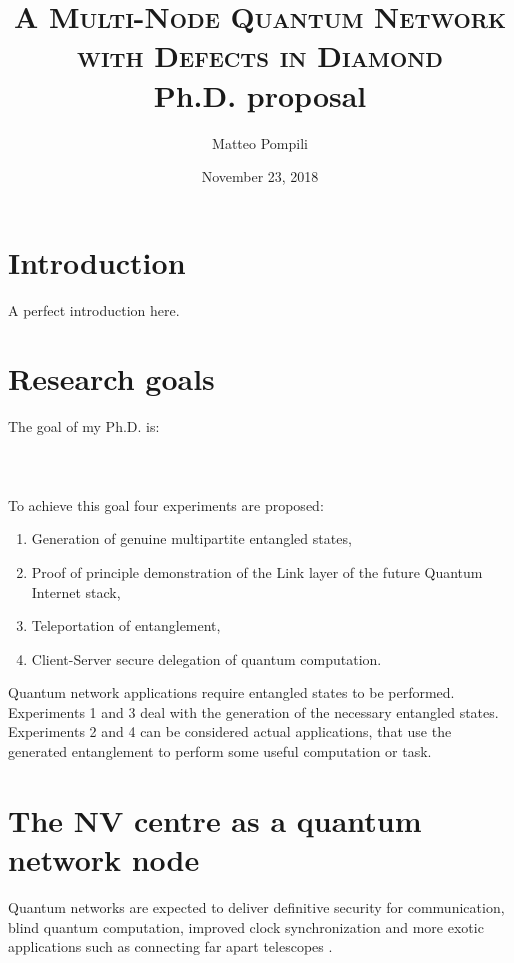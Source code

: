 \documentclass[a4paper, twoside]{article}
\title{
	\huge{\textsc{A Multi-Node Quantum Network\\with Defects in Diamond}}\\
	\vspace{10pt}\Large{Ph.D. proposal}
}
\author{Matteo Pompili}
\date{November 23, 2018}
\begin{document}
\maketitle

\section*{Introduction}
A perfect introduction here.
\blindtext[2]

\setcounter{secnumdepth}{1}
\setcounter{tocdepth}{1}
\tableofcontents

\newpage
\pagestyle{plain}
\section{Research goals}
The goal of my Ph.D. is:\\\\
\\\\

To achieve this goal four experiments are proposed: 
\begin{enumerate}
	\item Generation of genuine multipartite entangled states,
	\item Proof of principle demonstration of the Link layer of the future Quantum Internet stack,
	\item Teleportation of entanglement,
	\item Client-Server secure delegation of quantum computation.
\end{enumerate}

Quantum network applications require entangled states to be performed. Experiments 1 and 3 deal with the generation of the necessary entangled states. Experiments 2 and 4 can be considered actual applications, that use the generated entanglement to perform some useful computation or task.


\section{The NV centre as a quantum network node}

Quantum networks are expected to deliver definitive security for communication, blind quantum computation, improved clock synchronization and more exotic applications such as connecting far apart telescopes \cite{Wehner2018}.
\end{document}
